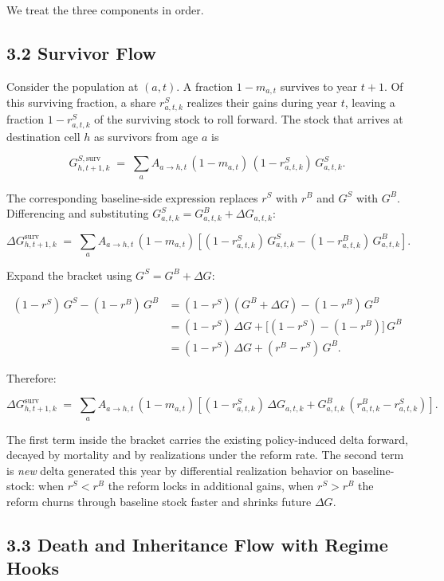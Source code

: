 \documentclass[11pt]{article}
\begin{document}
We treat the three components in order.

\subsection*{3.2 Survivor Flow}

Consider the population at $(a, t)$. A fraction $1 - m_{a,t}$ survives to year $t+1$. Of this surviving fraction, a share $r^S_{a,t,k}$ realizes their gains during year $t$, leaving a fraction $1 - r^S_{a,t,k}$ of the surviving stock to roll forward. The stock that arrives at destination cell $h$ as survivors from age $a$ is

\[
G^{S, \text{surv}}_{h, t+1, k}
\;=\;
\sum_a A_{a \to h, t}\,(1 - m_{a,t})\,(1 - r^S_{a,t,k})\,G^S_{a,t,k}.
\]

The corresponding baseline-side expression replaces $r^S$ with $r^B$ and $G^S$ with $G^B$. Differencing and substituting $G^S_{a,t,k} = G^B_{a,t,k} +
\Delta G_{a,t,k}$:

\[
\Delta G^{\text{surv}}_{h, t+1, k}
\;=\;
\sum_a A_{a \to h, t}\,(1 - m_{a,t})\!\left[
(1 - r^S_{a,t,k})\,G^S_{a,t,k} - (1 - r^B_{a,t,k})\,G^B_{a,t,k}
\right].
\]

Expand the bracket using $G^S = G^B + \Delta G$:

\[
\begin{aligned}
(1 - r^S)\,G^S - (1 - r^B)\,G^B
&= (1 - r^S)(G^B + \Delta G) - (1 - r^B)\,G^B \\
&= (1 - r^S)\,\Delta G + \big[(1 - r^S) - (1 - r^B)\big]\,G^B \\
&= (1 - r^S)\,\Delta G + (r^B - r^S)\,G^B.
\end{aligned}
\]

Therefore:

\[
\boxed{
\Delta G^{\text{surv}}_{h, t+1, k}
\;=\;
\sum_a A_{a \to h, t}\,(1 - m_{a,t})\!\left[
(1 - r^S_{a,t,k})\,\Delta G_{a,t,k}
+ G^B_{a,t,k}\,(r^B_{a,t,k} - r^S_{a,t,k})
\right].
}
\]

The first term inside the bracket carries the existing policy-induced delta forward, decayed by mortality and by realizations under the reform rate. The second term is \emph{new} delta generated this year by differential realization behavior on baseline-stock: when $r^S < r^B$ the reform locks in additional gains, when $r^S > r^B$ the reform churns through baseline stock faster and shrinks future $\Delta G$.

\subsection*{3.3 Death and Inheritance Flow with Regime Hooks}
\end{document}
